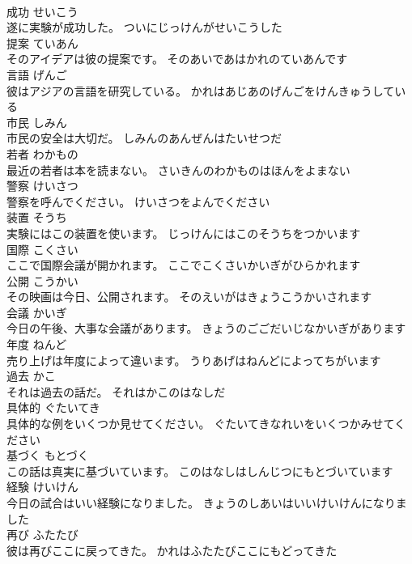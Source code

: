 \documentclass[8pt]{extreport}
\begin{document}
\begin{CJK}{UTF8}{min}
\\	成功	せいこう	
\\	遂に実験が成功した。	ついにじっけんがせいこうした	
\\	提案	ていあん	
\\	そのアイデアは彼の提案です。	そのあいであはかれのていあんです	
\\	言語	げんご	
\\	彼はアジアの言語を研究している。	かれはあじあのげんごをけんきゅうしている	
\\	市民	しみん	
\\	市民の安全は大切だ。	しみんのあんぜんはたいせつだ	
\\	若者	わかもの	
\\	最近の若者は本を読まない。	さいきんのわかものはほんをよまない	
\\	警察	けいさつ	
\\	警察を呼んでください。	けいさつをよんでください	
\\	装置	そうち	
\\	実験にはこの装置を使います。	じっけんにはこのそうちをつかいます	
\\	国際	こくさい	
\\	ここで国際会議が開かれます。	ここでこくさいかいぎがひらかれます	
\\	公開	こうかい	
\\	その映画は今日、公開されます。	そのえいがはきょうこうかいされます	
\\	会議	かいぎ	
\\	今日の午後、大事な会議があります。	きょうのごごだいじなかいぎがあります	
\\	年度	ねんど	
\\	売り上げは年度によって違います。	うりあげはねんどによってちがいます	
\\	過去	かこ	
\\	それは過去の話だ。	それはかこのはなしだ	
\\	具体的	ぐたいてき	
\\	具体的な例をいくつか見せてください。	ぐたいてきなれいをいくつかみせてください	
\\	基づく	もとづく	
\\	この話は真実に基づいています。	このはなしはしんじつにもとづいています	
\\	経験	けいけん	
\\	今日の試合はいい経験になりました。	きょうのしあいはいいけいけんになりました	
\\	再び	ふたたび	
\\	彼は再びここに戻ってきた。	かれはふたたびここにもどってきた	

\end{CJK}
\end{document}
